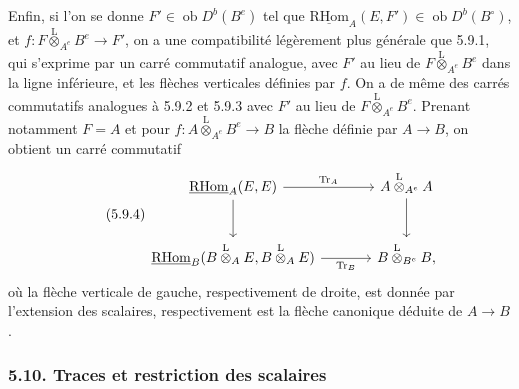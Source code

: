 \documentclass[11pt]{article}
\newcommand{\ob}{\operatorname{ob}}
\providecommand{\RHom}{\mathrm{RHom}}
\providecommand{\uRHom}{\underline{\RHom}}
\providecommand{\Tr}{\operatorname{Tr}}
\providecommand{\Tr}{\operatorname{Tr}}
\providecommand{\lten}{\overset{\mathrm L}{\otimes}}
\providecommand{\Tr}{\operatorname{Tr}}
\providecommand{\RHom}{\mathrm{RHom}}
\providecommand{\ob}{\operatorname{ob}}
\providecommand{\lten}{\overset{\mathrm L}{\otimes}}
\providecommand{\RHom}{\mathrm R\mathcal{H}om}
\providecommand{\lten}{\overset{\mathrm L}{\otimes}}
\providecommand{\Tr}{\operatorname{Tr}}
\providecommand{\lten}{\overset{\mathrm L}{\otimes}}
\providecommand{\lten}{\overset{\mathrm L}{\otimes}}
\providecommand{\lten}{\overset{\mathrm L}{\otimes}}
\providecommand{\RHom}{\mathrm{RHom}}
\providecommand{\Tr}{\operatorname{Tr}}
\providecommand{\lten}{\overset{\mathrm L}{\otimes}}
\begin{document}
Enfin, si l'on se donne $F'\in\ob D^b(B^e)$ tel que $\uRHom_A(E,F')\in\ob D^b(B^\circ)$, et $f:F\lten_{A^e}B^e\to F'$, on a une compatibilité légèrement plus générale que 5.9.1, qui s'exprime par un carré commutatif analogue, avec $F'$ au lieu de $F\lten_{A^e}B^e$ dans la ligne inférieure, et les flèches verticales définies par $f$. On a de même des carrés commutatifs analogues à 5.9.2 et 5.9.3 avec $F'$ au lieu de $F\lten_{A^e}B^e$. Prenant notamment $F=A$ et pour $f:A\lten_{A^e}B^e\to B$ la flèche définie par $A\to B$, on obtient un carré commutatif
\begin{equation}\tag{5.9.4}
\begin{tikzcd}[column sep=large,row sep=large]
\uRHom_A(E,E) \arrow[r,"\Tr_A"] \arrow[d] & A\lten_{A^e}A \arrow[d]\\
\uRHom_B(B\lten_AE,B\lten_AE) \arrow[r,"\Tr_B"'] & B\lten_{B^e}B,
\end{tikzcd}
\end{equation}
où la flèche verticale de gauche, respectivement de droite, est donnée par l'extension des scalaires, respectivement est la flèche canonique déduite de $A\to B$.

\subsubsection*{5.10. Traces et restriction des scalaires}
\end{document}
